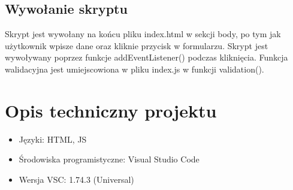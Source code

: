 \documentclass[12pt, letterpaper]{article}
\begin{document}
\subsection{Wywołanie skryptu}
\quad Skrypt jest wywołany na końcu pliku index.html w sekcji body, po tym jak użytkownik wpisze dane oraz kliknie przycisk w formularzu. Skrypt jest wywoływany poprzez funkcje addEventListener() podczas kliknięcia.
Funkcja walidacyjna jest umiejscowiona w pliku index.js w funkcji validation().

\section{Opis techniczny projektu}
\begin{itemize}
\item Języki: HTML, JS
\item Środowiska programistyczne: Visual Studio Code
\item Wersja VSC: 1.74.3 (Universal)
\end{itemize}
\end{document}

